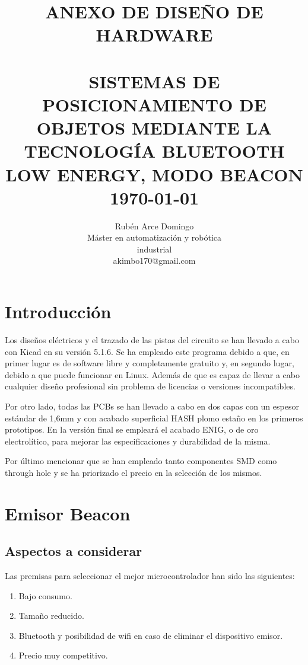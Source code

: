 \documentclass[paper=a4, fontsize=11pt,twoside]{scrartcl}	%
\title{	\normalsize \textsc{ANEXO DE DISEÑO DE HARDWARE} 	%
		 	\\[2.0cm]								%
			\HRule{0.5pt} \\						%
			\LARGE \textbf{\uppercase{Sistemas de posicionamiento de objetos mediante la tecnología Bluetooth Low Energy, modo Beacon}}	%
			\HRule{2pt} \\ [0.5cm]		%
			\normalsize \today			%
		}
\author{
		Rubén Arce Domingo\\	
		Máster en automatización y robótica\\	
        industrial\\
        akimbo170@gmail.com \\
}
\makeatletter
\def\printtitle{%
    {\centering \@title\par}}
\def\printauthor{%
    {\centering \large \@author}}
\makeatother
\begin{document}
\thispagestyle{empty}		%
\printtitle					%
  	\vfill
\printauthor				%
\newpage


\cleardoublepage
\tableofcontents
\listoffigures
\cleardoublepage
\pagestyle{fancy}

\section{Introducción}
    Los diseños eléctricos y el trazado de las pistas del circuito se han llevado a cabo con Kicad en 
    su versión 5.1.6. Se ha empleado este programa debido a que, en primer lugar es de software libre y
    completamente gratuito y, en segundo lugar, debido a que puede funcionar en Linux. Además de que es capaz de llevar a cabo 
    cualquier diseño profesional sin problema de licencias o versiones incompatibles.

    Por otro lado, todas las PCBs se han llevado a cabo en dos capas con un espesor estándar de 1,6mm y con acabado superficial
    HASH plomo estaño en los primeros prototipos. En la versión final se empleará el acabado ENIG, o de oro 
    electrolítico, para mejorar las especificaciones y durabilidad de la misma.

    Por último mencionar que se han empleado tanto componentes SMD como through hole y se ha priorizado el precio en la selección de los mismos.
\section{Emisor Beacon}
    \subsection{Aspectos a considerar}
        Las premisas para seleccionar el mejor microcontrolador han sido las siguientes: 
        \begin{enumerate}
            \item Bajo consumo.
            \item Tamaño reducido.
            \item Bluetooth y posibilidad de wifi en caso de eliminar el dispositivo emisor.
            \item Precio muy competitivo.
        \end{enumerate}
\end{document}

